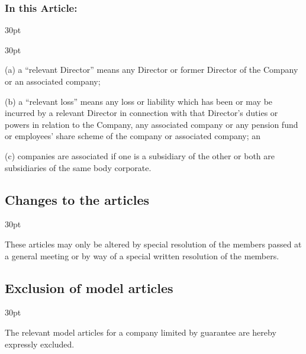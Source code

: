\documentclass[12pt]{article}
\def\clauseindent{30pt}
\newenvironment{subindentpara}{\raggedright\begin{adjustwidth}{\clauseindent}{}\begin{hanginglist}}{\end{hanginglist}\end{adjustwidth}}
\newenvironment{subindentlist}{\raggedright\begin{adjustwidth}{\clauseindent}{}\begin{labeledlist}{\clauseindent}}{\end{labeledlist}\end{adjustwidth}}
\begin{document}
\subsubsection[Specifics of purchase and maintainance of insurance]{In this Article:}
\begin{subindentlist}
    \item [(a)] a ``relevant Director'' means any Director or former Director of the Company or an associated company;
    \item [(b)] a ``relevant loss'' means any loss or liability which has been or may be incurred by a relevant Director in connection with that Director's duties or powers in relation to the Company, any associated company or any pension fund or employees' share scheme of the company or associated company; an
    \item [(c)] companies are associated if one is a subsidiary of the other or both are subsidiaries of the same body corporate.
\end{subindentlist}

\subsection{Changes to the articles}
\begin{subindentpara}
    \item These articles may only be altered by special resolution of the members passed at a general meeting or by way of a special written resolution of the members.
\end{subindentpara}

\subsection{Exclusion of model articles}
\begin{subindentpara}
    \item The relevant model articles for a company limited by guarantee are hereby expressly excluded.
\end{subindentpara}
\end{document}

